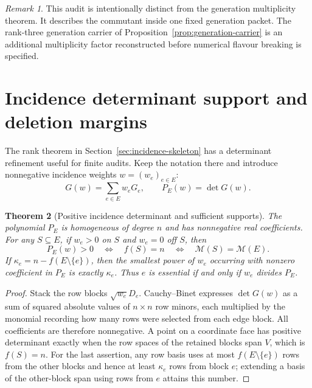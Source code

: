 \documentclass[11pt]{article}
\newtheorem{theorem}{Theorem}[section]
\theoremstyle{definition}
\theoremstyle{remark}
\newtheorem{remark}[theorem]{Remark}
\newcommand{\M}{\mathcal M}
\begin{document}
\begin{remark}
This audit is intentionally distinct from the generation multiplicity theorem.
It describes the commutant inside one fixed generation packet.  The
rank-three generation carrier of Proposition~\ref{prop:generation-carrier}
is an additional multiplicity factor reconstructed before numerical flavour
breaking is specified.
\end{remark}



\section{Incidence determinant support and deletion margins}
\label{app:incidence-details}

The rank theorem in Section~\ref{sec:incidence-skeleton} has a determinant
refinement useful for finite audits.  Keep the notation there and introduce
nonnegative incidence weights $w=(w_e)_{e\in E}$:
\begin{equation}
 G(w)=\sum_{e\in E}w_eG_e,
 \qquad P_E(w)=\det G(w).
 \label{eq:weighted-incidence-Gram}
\end{equation}

\begin{theorem}[Positive incidence determinant and sufficient supports]
\label{thm:incidence-determinant}
The polynomial $P_E$ is homogeneous of degree $n$ and has nonnegative real
coefficients.  For any $S\subseteq E$, if $w_e>0$ on $S$ and $w_e=0$ off
$S$, then
\begin{equation}
 \boxed{P_E(w)>0\quad\Longleftrightarrow\quad f(S)=n
 \quad\Longleftrightarrow\quad \M(S)=\M(E).}
 \label{eq:incidence-face-exactness}
\end{equation}
If
$\kappa_e=n-f(E\setminus\{e\})$, then the smallest power of $w_e$ occurring
with nonzero coefficient in $P_E$ is exactly $\kappa_e$.  Thus $e$ is
essential if and only if $w_e$ divides $P_E$.
\end{theorem}

\begin{proof}
Stack the row blocks $\sqrt{w_e}D_e$.  Cauchy--Binet expresses
$\det G(w)$ as a sum of squared absolute values of $n\times n$ row minors,
each multiplied by the monomial recording how many rows were selected from
each edge block.  All coefficients are therefore nonnegative.  A point on a
coordinate face has positive determinant exactly when the row spaces of the
retained blocks span $V$, which is $f(S)=n$.  For the last assertion, any row
basis uses at most $f(E\setminus\{e\})$ rows from the other blocks and hence
at least $\kappa_e$ rows from block $e$; extending a basis of the other-block
span using rows from $e$ attains this number.
\end{proof}
\end{document}
